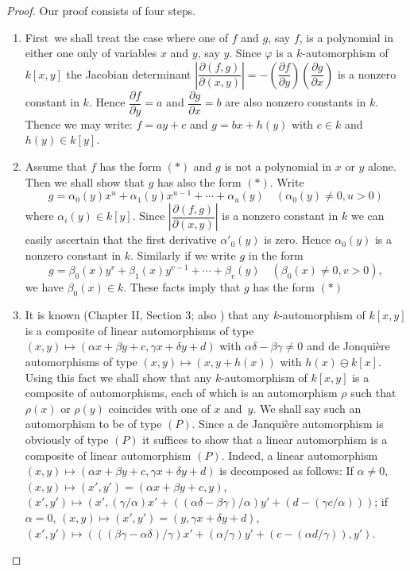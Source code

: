 \begin{proof}
Our proof consists of four steps.
\begin{enumerate}
\renewcommand{\theenumi}{\Roman{enumi}}
\renewcommand{\labelenumi}{(\theenumi)}
\item First\pageoriginale\ we shall treat the case where one of $f$ and
  $g$, say $f$, is a polynomial in either one only of variables $x$
  and $y$, say $y$. Since $\varphi$ is a $k$-automorphism of $k[x,y]$
  the Jacobian determinant $\left|\dfrac{\partial(f,g)}{\partial
    (x,y)}\right|=-\left(\dfrac{\partial f}{\partial
    y}\right)\left(\dfrac{\partial g}{\partial x}\right)$ is a nonzero
  constant in $k$. Hence $\dfrac{\partial f}{\partial y}=a$ and
  $\dfrac{\partial g}{\partial x}=b$ are also nonzero constants in
  $k$. Thence we may write: $f=ay+c$ and $g=bx+h(y)$ with $c\in k$ and
  $h(y)\in k[y]$.

\item Assume that $f$ has the form $(\ast)$ and $g$ is not a
  polynomial in $x$ or $y$ alone. Then we shall show that $g$ has also
  the form $(\ast)$. Write
$$
g=\alpha_{0}(y)x^{u}+\alpha_{1}(y)x^{u-1}+\cdots+\alpha_{u}(y)\quad
(\alpha_{0}(y)\neq 0, u>0) 
$$
where $\alpha_{i}(y)\in k[y]$. Since $\left|\dfrac{\partial
  (f,g)}{\partial(x,y)}\right|$ is a nonzero constant in $k$ we can
easily ascertain that the first derivative $\alpha'_{0}(y)$ is
zero. Hence $\alpha_{0}(y)$ is a nonzero constant in $k$. Similarly if
we write $g$ in the form
$$
g=\beta_{0}(x)y^{v}+\beta_{1}(x)y^{v-1}+\cdots+\beta_{v}(y)\quad
(\beta_{0}(x)\neq 0, v>0),
$$
we have $\beta_{0}(x)\in k$. These facts imply that $g$ has the form
$(\ast)$ 

\item It is known (\cf Chapter II, Section 3; also \cite{43}) that any
  $k$-auto\-morphism of $k[x,y]$ is a composite of linear automorphisms
  of type $(x,y)\mapsto (\alpha x+\beta y+c,\gamma x+\delta y+d)$ with
  $\alpha\delta-\beta\gamma\neq 0$ and de Jonqui\`ere automorphisms of
  type $(x,y)\mapsto (x,y+h(x))$ with $h(x)\ominus k[x]$. Using this
  fact we shall show that any $k$-automorphism of $k[x,y]$ is a
  composite of automorphisms, each of which is an automorphism $\rho$
  such that $\rho(x)$ or $\rho(y)$ coincides with one of $x$
  and\pageoriginale\ $y$. We shall say such an automorphism to be of
  type $(P)$. Since a de Janqui\`ere automorphism is obviously of type
  $(P)$ it suffices to show that a linear automorphism is a composite
  of linear automorphism $(P)$. Indeed, a linear automorphism
  $(x,y)\mapsto (\alpha x+\beta y+c,\gamma x+\delta y+d)$ is
  decomposed as follows: If $\alpha\neq 0$, $(x,y)\mapsto
  (x',y')=(\alpha x+\beta y+c, y)$, $(x',y')\mapsto
  (x',(\gamma/\alpha)x'+((\alpha
  \delta-\beta\gamma)/\alpha)y'+(d-(\gamma c/\alpha)))$; if
  $\alpha=0$, $(x,y)\mapsto (x',y')=(y,\gamma x+\delta y+d)$,
  $(x',y')\mapsto
  (((\beta\gamma-\alpha\delta)/\gamma)x'+(\alpha/\gamma)y'+(c-(\alpha
  d/\gamma)),y')$. 


\end{enumerate}
\end{proof}
